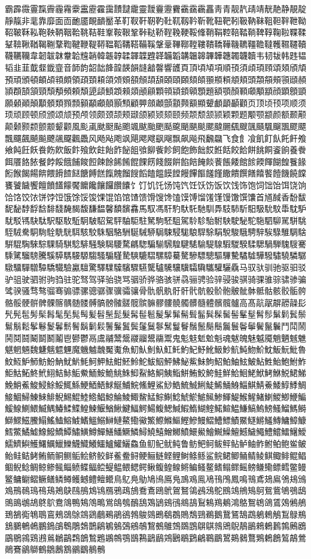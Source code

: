 霸霹霺霻霼霽霾霿靀靁靂靃靄靅靆靇靈靉靊靋靌靍靎靏靐靑青靓靔靕靖靗靘静靚靛靜靝非靟靠靡面靣靤靥靦靧靨革靪靫靬靭靮靯靰靱靲靳靴靵靶靷靸靹靺靻靼靽靾靿鞀鞁鞂鞃鞄鞅鞆鞇鞈鞉鞊鞋鞌鞍鞎鞏鞐鞑鞒鞓鞔鞕鞖鞗鞘鞙鞚鞛鞜鞝鞞鞟鞠鞡鞢鞣鞤鞥鞦鞧鞨鞩鞪鞫鞬鞭鞮鞯鞰鞱鞲鞳鞴鞵鞶鞷鞸鞹鞺鞻鞼鞽鞾鞿韀韁韂韃韄韅韆韇韈韉韊韋韌韍韎韏韐韑韒韓韔韕韖韗韘韙韚韛韜韝韞韟韠韡韢韣韤韥韦韧韨韩韪韫韬韭韮韯韰韱韲音韴韵韶韷韸韹韺韻韼韽韾響頀頁頂頃頄項順頇須頉頊頋頌頍頎頏預頑頒頓頔頕頖頗領頙頚頛頜頝頞頟頠頡頢頣頤頥頦頧頨頩頪頫頬頭頮頯頰頱頲頳頴頵頶頷頸頹頺頻頼頽頾頿顀顁顂顃顄顅顆顇顈顉顊顋題額顎顏顐顑顒顓顔顕顖顗願顙顚顛顜顝類顟顠顡顢顣顤顥顦顧顨顩顪顫顬顭顮顯顰顱顲顳顴页顶顷顸项顺须顼顽顾顿颀颁颂颃预颅领颇颈颉颊颋颌颍颎颏颐频颒颓颔颕颖颗题颙颚颛颜额颞颟颠颡颢颣颤颥颦颧風颩颪颫颬颭颮颯颰颱颲颳颴颵颶颷颸颹颺颻颼颽颾颿飀飁飂飃飄飅飆飇飈飉飊飋飌飍风飏飐飑飒飓飔飕飖飗飘飙飚飛飜飝飞食飠飡飢飣飤飥飦飧飨飩飪飫飬飭飮飯飰飱飲飳飴飵飶飷飸飹飺飻飼飽飾飿餀餁餂餃餄餅餆餇餈餉養餋餌餍餎餏餐餑餒餓餔餕餖餗餘餙餚餛餜餝餞餟餠餡餢餣餤餥餦餧館餩餪餫餬餭餮餯餰餱餲餳餴餵餶餷餸餹餺餻餼餽餾餿饀饁饂饃饄饅饆饇饈饉饊饋饌饍饎饏饐饑饒饓饔饕饖饗饘饙饚饛饜饝饞饟饠饡饢饣饤饥饦饧饨饩饪饫饬饭饮饯饰饱饲饳饴饵饶饷饸饹饺饻饼饽饾饿馀馁馂馃馄馅馆馇馈馉馊馋馌馍馎馏馐馑馒馓馔馕首馗馘香馚馛馜馝馞馟馠馡馢馣馤馥馦馧馨馩馪馫馬馭馮馯馰馱馲馳馴馵馶馷馸馹馺馻馼馽馾馿駀駁駂駃駄駅駆駇駈駉駊駋駌駍駎駏駐駑駒駓駔駕駖駗駘駙駚駛駜駝駞駟駠駡駢駣駤駥駦駧駨駩駪駫駬駭駮駯駰駱駲駳駴駵駶駷駸駹駺駻駼駽駾駿騀騁騂騃騄騅騆騇騈騉騊騋騌騍騎騏騐騑騒験騔騕騖騗騘騙騚騛騜騝騞騟騠騡騢騣騤騥騦騧騨騩騪騫騬騭騮騯騰騱騲騳騴騵騶騷騸騹騺騻騼騽騾騿驀驁驂驃驄驅驆驇驈驉驊驋驌驍驎驏驐驑驒驓驔驕驖驗驘驙驚驛驜驝驞驟驠驡驢驣驤驥驦驧驨驩驪驫马驭驮驯驰驱驲驳驴驵驶驷驸驹驺驻驼驽驾驿骀骁骂骃骄骅骆骇骈骉骊骋验骍骎骏骐骑骒骓骔骕骖骗骘骙骚骛骜骝骞骟骠骡骢骣骤骥骦骧骨骩骪骫骬骭骮骯骰骱骲骳骴骵骶骷骸骹骺骻骼骽骾骿髀髁髂髃髄髅髆髇髈髉髊髋髌髍髎髏髐髑髒髓體髕髖髗高髙髚髛髜髝髞髟髠髡髢髣髤髥髦髧髨髩髪髫髬髭髮髯髰髱髲髳髴髵髶髷髸髹髺髻髼髽髾髿鬀鬁鬂鬃鬄鬅鬆鬇鬈鬉鬊鬋鬌鬍鬎鬏鬐鬑鬒鬓鬔鬕鬖鬗鬘鬙鬚鬛鬜鬝鬞鬟鬠鬡鬢鬣鬤鬥鬦鬧鬨鬩鬪鬫鬬鬭鬮鬯鬰鬱鬲鬳鬴鬵鬶鬷鬸鬹鬺鬻鬼鬽鬾鬿魀魁魂魃魄魅魆魇魈魉魊魋魌魍魎魏魐魑魒魓魔魕魖魗魘魙魚魛魜魝魞魟魠魡魢魣魤魥魦魧魨魩魪魫魬魭魮魯魰魱魲魳魴魵魶魷魸魹魺魻魼魽魾魿鮀鮁鮂鮃鮄鮅鮆鮇鮈鮉鮊鮋鮌鮍鮎鮏鮐鮑鮒鮓鮔鮕鮖鮗鮘鮙鮚鮛鮜鮝鮞鮟鮠鮡鮢鮣鮤鮥鮦鮧鮨鮩鮪鮫鮬鮭鮮鮯鮰鮱鮲鮳鮴鮵鮶鮷鮸鮹鮺鮻鮼鮽鮾鮿鯀鯁鯂鯃鯄鯅鯆鯇鯈鯉鯊鯋鯌鯍鯎鯏鯐鯑鯒鯓鯔鯕鯖鯗鯘鯙鯚鯛鯜鯝鯞鯟鯠鯡鯢鯣鯤鯥鯦鯧鯨鯩鯪鯫鯬鯭鯮鯯鯰鯱鯲鯳鯴鯵鯶鯷鯸鯹鯺鯻鯼鯽鯾鯿鰀鰁鰂鰃鰄鰅鰆鰇鰈鰉鰊鰋鰌鰍鰎鰏鰐鰑鰒鰓鰔鰕鰖鰗鰘鰙鰚鰛鰜鰝鰞鰟鰠鰡鰢鰣鰤鰥鰦鰧鰨鰩鰪鰫鰬鰭鰮鰯鰰鰱鰲鰳鰴鰵鰶鰷鰸鰹鰺鰻鰼鰽鰾鰿鱀鱁鱂鱃鱄鱅鱆鱇鱈鱉鱊鱋鱌鱍鱎鱏鱐鱑鱒鱓鱔鱕鱖鱗鱘鱙鱚鱛鱜鱝鱞鱟鱠鱡鱢鱣鱤鱥鱦鱧鱨鱩鱪鱫鱬鱭鱮鱯鱰鱱鱲鱳鱴鱵鱶鱷鱸鱹鱺鱻鱼鱽鱾鱿鲀鲁鲂鲃鲄鲅鲆鲇鲈鲉鲊鲋鲌鲍鲎鲏鲐鲑鲒鲓鲔鲕鲖鲗鲘鲙鲚鲛鲜鲝鲞鲟鲠鲡鲢鲣鲤鲥鲦鲧鲨鲩鲪鲫鲬鲭鲮鲯鲰鲱鲲鲳鲴鲵鲶鲷鲸鲹鲺鲻鲼鲽鲾鲿鳀鳁鳂鳃鳄鳅鳆鳇鳈鳉鳊鳋鳌鳍鳎鳏鳐鳑鳒鳓鳔鳕鳖鳗鳘鳙鳚鳛鳜鳝鳞鳟鳠鳡鳢鳣鳤鳥鳦鳧鳨鳩鳪鳫鳬鳭鳮鳯鳰鳱鳲鳳鳴鳵鳶鳷鳸鳹鳺鳻鳼鳽鳾鳿鴀鴁鴂鴃鴄鴅鴆鴇鴈鴉鴊鴋鴌鴍鴎鴏鴐鴑鴒鴓鴔鴕鴖鴗鴘鴙鴚鴛鴜鴝鴞鴟鴠鴡鴢鴣鴤鴥鴦鴧鴨鴩鴪鴫鴬鴭鴮鴯鴰鴱鴲鴳鴴鴵鴶鴷鴸鴹鴺鴻鴼鴽鴾鴿鵀鵁鵂鵃鵄鵅鵆鵇鵈鵉鵊鵋鵌鵍鵎鵏鵐鵑鵒鵓鵔鵕鵖鵗鵘鵙鵚鵛鵜鵝鵞鵟鵠鵡鵢鵣鵤鵥鵦鵧鵨鵩鵪鵫鵬鵭鵮鵯鵰鵱鵲鵳鵴鵵鵶鵷鵸鵹鵺鵻鵼鵽鵾鵿鶀鶁鶂鶃鶄鶅鶆鶇鶈鶉鶊鶋鶌鶍鶎鶏鶐鶑鶒鶓鶔鶕鶖鶗鶘鶙鶚鶛鶜鶝鶞鶟鶠鶡鶢鶣鶤鶥鶦鶧鶨鶩鶪鶫鶬鶭鶮鶯鶰鶱鶲鶳鶴鶵鶶鶷鶸鶹鶺鶻